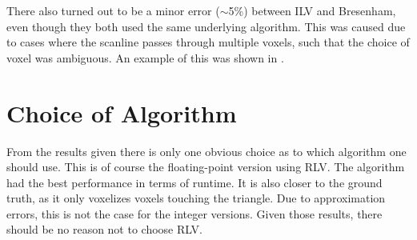 There also turned out to be a minor error ($\sim$5\%) between ILV and Bresenham, even though they both used the same underlying algorithm.
This was caused due to cases where the scanline passes through multiple voxels, such that the choice of voxel was ambiguous.
An example of this was shown in .

\section{Choice of Algorithm}
From the results given there is only one obvious choice as to which algorithm one should use.
This is of course the floating-point version using RLV.
The algorithm had the best performance in terms of runtime.
It is also closer to the ground truth, as it only voxelizes voxels touching the triangle.
Due to approximation errors, this is not the case for the integer versions.
Given those results, there should be no reason not to choose RLV.
